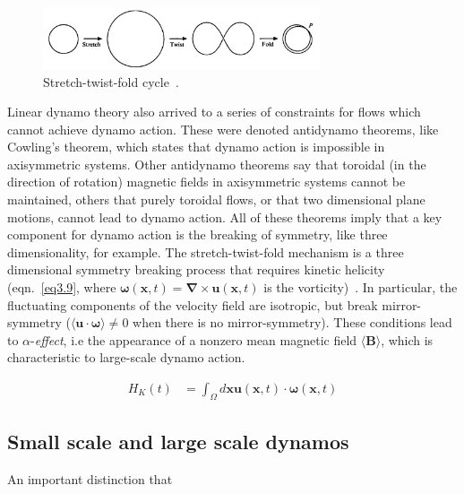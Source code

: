 \documentclass[12pt,a4paper]{report}
\begin{document}
\begin{figure}[!ht]
\centering
\includegraphics[width=0.73\textwidth]{img/STF}
\caption{Stretch-twist-fold cycle~\cite{moffatt1985topological}.}
\label{fig3.2}
\end{figure}

Linear dynamo theory also arrived to a series of constraints for flows which cannot achieve dynamo action. These were denoted antidynamo theorems, like Cowling's theorem, which states that dynamo action is impossible in axisymmetric systems. Other antidynamo theorems say that toroidal (in the direction of rotation) magnetic fields in axisymmetric systems cannot be maintained, others that purely toroidal flows, or that two dimensional plane motions, cannot lead to dynamo action. All of these theorems imply that a key component for dynamo action is the breaking of symmetry, like three dimensionality, for example. The stretch-twist-fold mechanism is a three dimensional symmetry breaking process that requires kinetic helicity (eqn.~\ref{eq3.9}, where $ \bm \omega(\bm x, t) = \bm \nabla \times \bm u(\bm x, t)$ is the vorticity)~\cite{LinkmannMoritzFrederikLeon2016Spim}. In particular, the fluctuating components of the velocity field are isotropic, but break mirror-symmetry ($\langle \bm u \cdot \bm \omega \rangle \neq 0$ when there is no mirror-symmetry). These conditions lead to $\alpha$-\textit{effect}, i.e the appearance of a nonzero mean magnetic field $\langle \bm B \rangle$, which is characteristic to large-scale dynamo action.

\begin{align}
 H_K(t) &= \int_\Omega d \bm x \bm u(\bm x, t) \cdot \bm \omega(\bm x, t) \label{eq3.9}
\end{align}

\subsection{Small scale and large scale dynamos}

An important distinction that 
\end{document}
